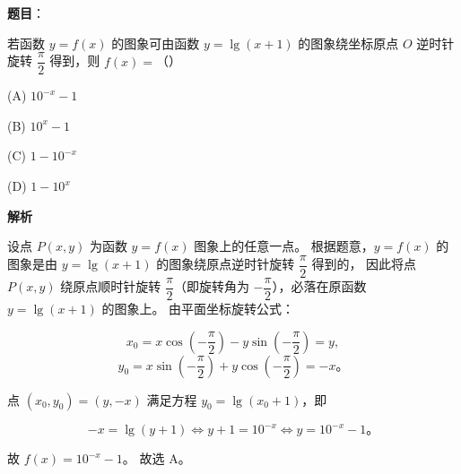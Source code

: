 \begin{answer}

\textbf{题目}：

若函数 $y = f(x)$ 的图象可由函数 $y = \lg(x + 1)$ 的图象绕坐标原点 $O$ 逆时针旋转 $\dfrac{\pi}{2}$ 得到，则 $f(x) = $（\qquad）

(A) $10^{-x} - 1$

(B) $10^x - 1$

(C) $1 - 10^{-x}$

(D) $1 - 10^x$

\textbf{解析}

设点 $P(x, y)$ 为函数 $y = f(x)$ 图象上的任意一点。
根据题意，$y = f(x)$ 的图象是由 $y = \lg(x + 1)$ 的图象绕原点逆时针旋转 $\dfrac{\pi}{2}$ 得到的，
因此将点 $P(x, y)$ 绕原点顺时针旋转 $\dfrac{\pi}{2}$（即旋转角为 $-\dfrac{\pi}{2}$），必落在原函数 $y = \lg(x + 1)$ 的图象上。
由平面坐标旋转公式：

\nopagebreak[4]
\[
x_0 = x\cos\left(-\dfrac{\pi}{2}\right) - y\sin\left(-\dfrac{\pi}{2}\right) = y,
\]
\nopagebreak[4]
\[
y_0 = x\sin\left(-\dfrac{\pi}{2}\right) + y\cos\left(-\dfrac{\pi}{2}\right) = -x\mbox{。}
\]

点 $(x_0, y_0) = (y, -x)$ 满足方程 $y_0 = \lg(x_0 + 1)$，即

\nopagebreak[4]
\[
-x = \lg(y + 1) \iff y + 1 = 10^{-x} \iff y = 10^{-x} - 1\mbox{。}
\]

故 $f(x) = 10^{-x} - 1$。
故选 A。


\end{answer}
